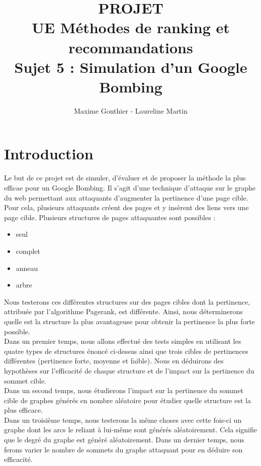 \documentclass[a4paper,11pt]{article}
\title{PROJET\\ UE Méthodes de ranking et recommandations\\ 
		Sujet 5 : Simulation d'un Google Bombing}
\author{Maxime Gonthier - Laureline Martin}
\begin{document}
\clearpage
	\clearpage
	\maketitle
	\newpage\clearpage{}

\newpage
\tableofcontents

\newpage
\section{Introduction}
	Le but de ce projet est de simuler, d'évaluer et de proposer la méthode la plus efficae pour un Google Bombing. Il s'agit d'une technique d'attaque sur le graphe du web permettant aux attaquants d'augmenter la pertinence d'une page cible.\\
	Pour cela, plusieurs attaquants créent des pages et y insèrent des liens vers une page cible. Plusieurs structures de pages attaquantes sont possibles :
	\begin{itemize}
		\item seul
		\item complet
		\item anneau
		\item arbre
	\end{itemize}
	Nous testerons ces différentes structures sur des pages cibles dont la pertinence, attribuée par l'algorithme Pagerank, est différente. Ainsi, nous déterminerons quelle est la structure la plus avantageuse pour obtenir la pertinence la plus forte possible.\\
	Dans un premier temps, nous allons effectué des tests simples en utilisant les quatre types de structures énoncé ci-dessus ainsi que trois cibles de pertinences différentes (pertinence forte, moyenne et faible). Nous en déduirons des hypothèses sur l'efficacité de chaque structure et de l'impact sur la pertinence du sommet cible.\\
	Dans un second temps, nous étudierons l'impact sur la pertinence du sommet cible de graphes générés en nombre aléatoire pour étudier quelle structure est la plus efficace.\\
	Dans un troisième temps, nous testerons la même choses avec cette fois-ci un graphe dont les arcs le reliant à lui-même sont générés aléatoirement. Cela signifie que le degré du graphe est généré aléatoirement.
	Dans un dernier temps, nous ferons varier le nombre de sommets du graphe attaquant pour en déduire son efficacité.
\end{document}
